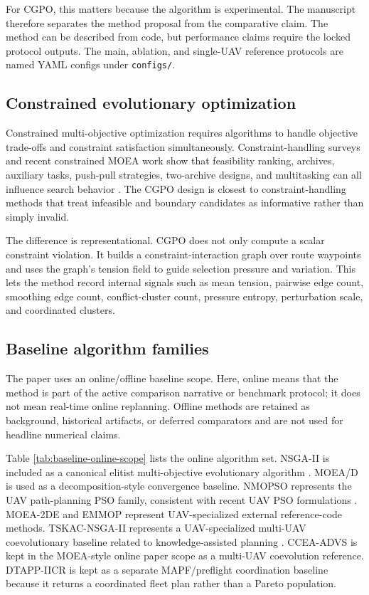 \documentclass[a4paper,fleqn]{cas-dc}
\begin{document}
For CGPO, this matters because the algorithm is experimental. The manuscript therefore separates the method proposal from the comparative claim. The method can be described from code, but performance claims require the locked protocol outputs. The main, ablation, and single-UAV reference protocols are named YAML configs under \texttt{configs/}.

\subsection{Constrained evolutionary optimization}

Constrained multi-objective optimization requires algorithms to handle objective trade-offs and constraint satisfaction simultaneously. Constraint-handling surveys and recent constrained MOEA work show that feasibility ranking, archives, auxiliary tasks, push-pull strategies, two-archive designs, and multitasking can all influence search behavior \cite{mezura2011constraint_survey,ming2024emt_cmop,yu2024constraint_emt}. The CGPO design is closest to constraint-handling methods that treat infeasible and boundary candidates as informative rather than simply invalid.

The difference is representational. CGPO does not only compute a scalar constraint violation. It builds a constraint-interaction graph over route waypoints and uses the graph's tension field to guide selection pressure and variation. This lets the method record internal signals such as mean tension, pairwise edge count, smoothing edge count, conflict-cluster count, pressure entropy, perturbation scale, and coordinated clusters.

\subsection{Baseline algorithm families}

The paper uses an online/offline baseline scope. Here, online means that the method is part of the active comparison narrative or benchmark protocol; it does not mean real-time online replanning. Offline methods are retained as background, historical artifacts, or deferred comparators and are not used for headline numerical claims.

Table \ref{tab:baseline-online-scope} lists the online algorithm set. NSGA-II is included as a canonical elitist multi-objective evolutionary algorithm \cite{deb2002nsga2}. MOEA/D is used as a decomposition-style convergence baseline. NMOPSO represents the UAV path-planning PSO family, consistent with recent UAV PSO formulations \cite{duong2025nmopso_uav}. MOEA-2DE and EMMOP represent UAV-specialized external reference-code methods. TSKAC-NSGA-II represents a UAV-specialized multi-UAV coevolutionary baseline related to knowledge-assisted planning \cite{zhou2024tskac}. CCEA-ADVS is kept in the MOEA-style online paper scope as a multi-UAV coevolution reference. DTAPP-IICR is kept as a separate MAPF/preflight coordination baseline because it returns a coordinated fleet plan rather than a Pareto population.
\end{document}
